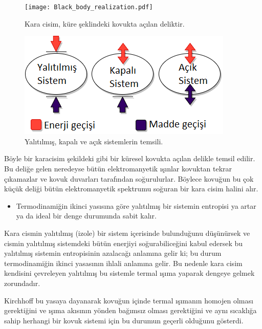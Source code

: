 \documentclass[a4paper,12pt, twoside]{article}
\begin{document}
\begin{figure}
\center
\texttt{[image: Black\_body\_realization.pdf]}
\caption{Kara cisim, küre şeklindeki kovukta açılan deliktir.}
\label{fig:karacisim}
\end{figure}

\begin{figure}
	\center
	\includegraphics[scale=1.35]{open_closed_isolated_systems.png}
	\caption{Yalıtılmış, kapalı ve açık sistemlerin temsili.}
	\label{fig:systems_isolated}
\end{figure}


Böyle bir karacisim şekildeki gibi bir küresel kovukta açılan delikle temsil edilir. Bu deliğe gelen neredeyse bütün elektromanyetik ışınlar kovuktan tekrar çıkamazlar ve kovuk duvarları tarafından soğurulurlar. Böylece kovuğun bu çok küçük deliği bütün elektromanyetik spektrumu soğuran bir kara cisim halini alır.

\begin{itemize}
\item Termodinamiğin ikinci yasısına göre yalıtılmış bir sistemin entropisi ya artar ya da ideal bir denge durumunda sabit kalır.
\end{itemize}

Kara cismin yalıtılmış (izole) bir sistem içerisinde bulunduğunu düşünürsek ve cismin yalıtılmış sistemdeki bütün enerjiyi soğurabiliceğini kabul edersek bu yalıtılmış sistemin entropisinin azalacağı anlamına gelir ki; bu durum termodinamiğin ikinci yasasının ihlali anlamına gelir. Bu nedenle kara cisim kendisini çevreleyen yalıtılmış bu sistemle termal ışıma yaparak dengeye gelmek zorundadır.

Kirchhoff bu yasaya dayanarak kovuğun içinde termal ışımanın homojen olması gerektiğini ve ışıma akısının yönden bağımsız olması gerektiğini ve aynı sıcaklığa sahip herhangi bir kovuk sistemi için bu durumun geçerli olduğunu gösterdi.

\end{document}
